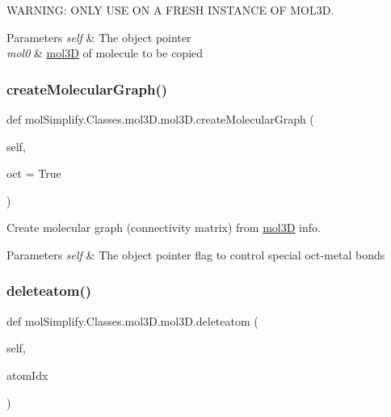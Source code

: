 W\+A\+R\+N\+I\+NG\+: O\+N\+LY U\+SE ON A F\+R\+E\+SH I\+N\+S\+T\+A\+N\+CE OF M\+O\+L3D. 
\begin{DoxyParams}{Parameters}
{\em self} & The object pointer \\
\hline
{\em mol0} & \hyperlink{classmolSimplify_1_1Classes_1_1mol3D_1_1mol3D}{mol3D} of molecule to be copied \\
\hline
\end{DoxyParams}
\mbox{\label{classmolSimplify_1_1Classes_1_1mol3D_1_1mol3D_a0199a2e25288c8624acfb67733cb699f}} 
\subsubsection{\texorpdfstring{create\+Molecular\+Graph()}{createMolecularGraph()}}
{\footnotesize\ttfamily def mol\+Simplify.\+Classes.\+mol3\+D.\+mol3\+D.\+create\+Molecular\+Graph (\begin{DoxyParamCaption}\item[{}]{self,  }\item[{}]{oct = {\ttfamily True} }\end{DoxyParamCaption})}



Create molecular graph (connectivity matrix) from \hyperlink{classmolSimplify_1_1Classes_1_1mol3D_1_1mol3D}{mol3D} info. 


\begin{DoxyParams}{Parameters}
{\em self} & The object pointer  flag to control special oct-\/metal bonds \\
\hline
\end{DoxyParams}
\mbox{\label{classmolSimplify_1_1Classes_1_1mol3D_1_1mol3D_a6838664445a9896c703e0ffe2542ceef}} 
\subsubsection{\texorpdfstring{deleteatom()}{deleteatom()}}
{\footnotesize\ttfamily def mol\+Simplify.\+Classes.\+mol3\+D.\+mol3\+D.\+deleteatom (\begin{DoxyParamCaption}\item[{}]{self,  }\item[{}]{atom\+Idx }\end{DoxyParamCaption})}




